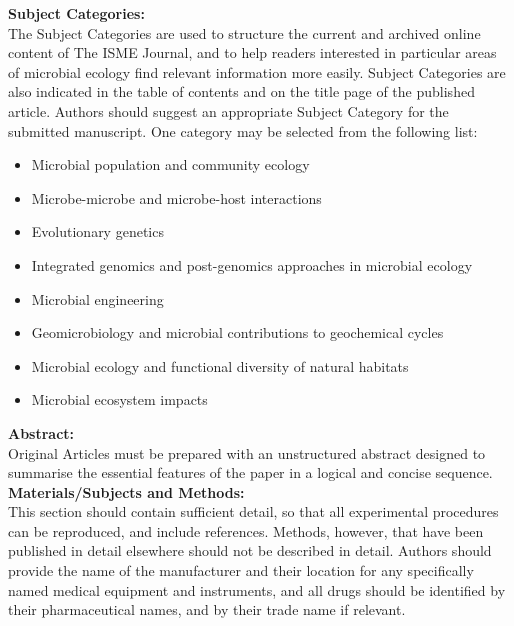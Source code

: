 \documentclass{article}
\providecommand{\tightlist}{\setlength{\itemsep}{0pt}\setlength{\parskip}{0pt}}%
\begin{document}
\textbf{Subject Categories:}\\

The Subject Categories are used to structure the current and archived
online content of The ISME Journal, and to help readers interested in
particular areas of microbial ecology find relevant information more
easily. Subject Categories are also indicated in the table of contents
and on the title page of the published article. Authors should suggest
an appropriate Subject Category for the submitted manuscript. One
category may be selected from the following list:\\

\begin{itemize}
\tightlist
\item
  Microbial population and community ecology\\
\item
  Microbe-microbe and microbe-host interactions\\
\item
  Evolutionary genetics\\
\item
  Integrated genomics and post-genomics approaches in microbial
  ecology\\
\item
  Microbial engineering\\
\item
  Geomicrobiology and microbial contributions to geochemical cycles\\
\item
  Microbial ecology and functional diversity of natural habitats\\
\item
  Microbial ecosystem impacts\\
\end{itemize}

\textbf{Abstract:}\\

Original Articles must be prepared with an unstructured abstract
designed to summarise the essential features of the paper in a logical
and concise sequence.\\

\textbf{Materials/Subjects and Methods:}\\

This section should contain sufficient detail, so that all experimental
procedures can be reproduced, and include references. Methods, however,
that have been published in detail elsewhere should not be described in
detail. Authors should provide the name of the manufacturer and their
location for any specifically named medical equipment and instruments,
and all drugs should be identified by their pharmaceutical names, and by
their trade name if relevant.\\
\end{document}
